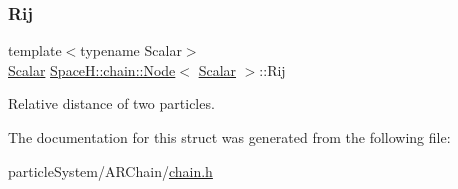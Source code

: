 \subsubsection{\texorpdfstring{Rij}{Rij}}
{\footnotesize\ttfamily template$<$typename Scalar$>$ \\
\mbox{\hyperlink{create_kepler_8cpp_a8c2981f3f834be9448a6ab06c28748eb}{Scalar}} \mbox{\hyperlink{struct_space_h_1_1chain_1_1_node}{Space\+H\+::chain\+::\+Node}}$<$ \mbox{\hyperlink{create_kepler_8cpp_a8c2981f3f834be9448a6ab06c28748eb}{Scalar}} $>$\+::Rij}

Relative distance of two particles. 

The documentation for this struct was generated from the following file\+:\begin{DoxyCompactItemize}
\item 
particle\+System/\+A\+R\+Chain/\mbox{\hyperlink{chain_8h}{chain.\+h}}\end{DoxyCompactItemize}
